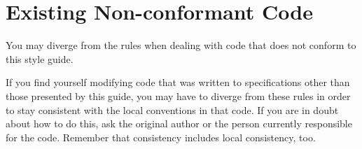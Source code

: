 
\section{Existing Non-conformant Code}\label{sec:existing-non-conformant-code}
You may diverge from the rules when dealing with code that does not conform to this style guide.

If you find yourself modifying code that was written to specifications other than those presented by this guide, you may have to diverge from these rules in order to stay consistent with the local conventions in that code. If you are in doubt about how to do this, ask the original author or the person currently responsible for the code. Remember that consistency includes local consistency, too.
